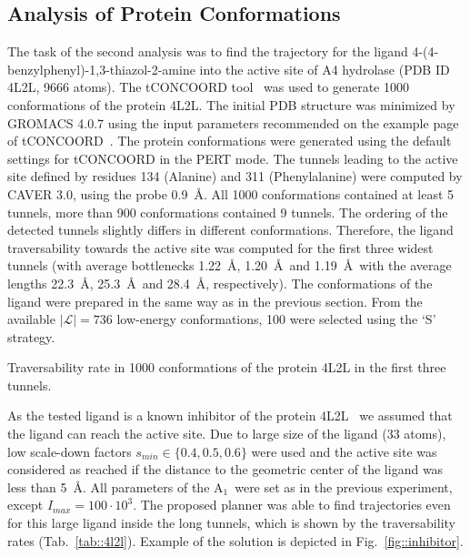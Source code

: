 \documentclass[usletter, 10pt, conference]{ieeeconf} %
\def\Imax{I_{max}} %
\def\smin{s_{min}}
\def\L{\mathcal{L}}
\def\RA{A$_{1}$}
\begin{document}
\subsection{Analysis of Protein Conformations}

The task of the second analysis was to find the trajectory for the ligand 4-(4-benzylphenyl)-1,3-thiazol-2-amine into the active
site of A4 hydrolase (PDB ID 4L2L, 9666 atoms).
The tCONCOORD tool~\cite{seeliger2007geometry} was used to generate 1000 conformations of the protein 4L2L.
The initial PDB structure was minimized by GROMACS 4.0.7
 using the input parameters recommended on the example page of tCONCOORD~\cite{tconcoord}.
The protein conformations were generated using the default settings for tCONCOORD in the PERT mode. %
The tunnels leading to the active site defined by residues 134 (Alanine) and 311 (Phenylalanine) were computed by CAVER 3.0, using the probe 0.9~\AA.
All 1000 conformations contained at least 5 tunnels, more than 900 conformations contained 9 tunnels.
The ordering of the detected tunnels slightly differs in different conformations.
Therefore, the ligand traversability towards the active site was computed for the first three widest tunnels (with average bottlenecks 1.22~\AA, 1.20~\AA\, and 1.19~\AA\ with the average lengths 22.3~\AA, 25.3~\AA\, and 28.4~\AA, respectively).
The conformations of the ligand were prepared in the same way as in the previous section.
From the available $|\L|=736$ low-energy conformations, 100 were selected using the `S' strategy.

\begin{table}[bt]
\centering
\caption{\label{tab::4l2l}
    \small
    Traversability rate in 1000 conformations of the protein 4L2L in the first three tunnels.
}
\small
\renewcommand{\tabcolsep}{2pt}
{
\scriptsize

}
\end{table}

As the tested ligand is a known inhibitor of the protein 4L2L~\cite{marques2017enzyme} we assumed that the ligand can reach the active site.
Due to large size of the ligand (33 atoms), low scale-down factors $\smin\in\{0.4,0.5,0.6\}$ were used and
the active site was considered as reached if the distance to the geometric center of the ligand was less than 5~\AA.
All parameters of the \RA\ were set as in the previous experiment, except $\Imax=100\cdot10^3$.
The proposed planner was able to find trajectories even for this large ligand inside the long tunnels, which is
shown by the traversability rates (Tab.~\ref{tab::4l2l}).
Example of the solution is depicted in Fig.~\ref{fig::inhibitor}.
\end{document}
